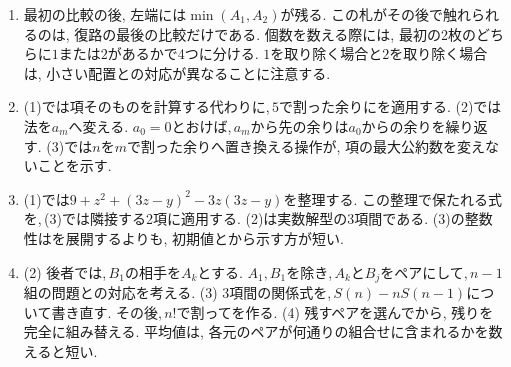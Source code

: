 \begin{enumerate}[label=\textbf{問\arabic*.},leftmargin=3.8em,format=\bookitemlink{practice-entrance}{hint}{problem}]
          \item 最初の比較の後, 左端には$\min(A_1,A_2)$が残る. この札がその後で触れられるのは, 復路の最後の比較だけである.
                個数を数える際には, 最初の2枚のどちらに$1$または$2$があるかで4つに分ける.
                $1$を取り除く場合と$2$を取り除く場合は, 小さい配置との対応が異なることに注意する.
          \item (1)では項そのものを計算する代わりに,\,$5$で割った余りにを適用する.
                (2)では法を$a_m$へ変える. $a_0=0$とおけば,\,$a_m$から先の余りは$a_0$からの余りを繰り返す.
                (3)では$n$を$m$で割った余りへ置き換える操作が, 項の最大公約数を変えないことを示す.
          \item (1)では$9+z^2+(3z-y)^2-3z(3z-y)$を整理する.
                この整理で保たれる式を,\,(3)では隣接する2項に適用する.
                (2)は実数解型の3項間である. (3)の整数性はを展開するよりも, 初期値とから示す方が短い.
          \item (2) 後者では,\,$B_1$の相手を$A_k$とする.
                $A_1,B_1$を除き,\,$A_k$と$B_j$をペアにして,\,$n-1$組の問題との対応を考える.
                (3) 3項間の関係式を,\,$S(n)-nS(n-1)$について書き直す.
                その後,\,$n!$で割ってを作る.
                (4) 残すペアを選んでから, 残りを完全に組み替える.
                平均値は, 各元のペアが何通りの組合せに含まれるかを数えると短い.
        \end{enumerate}

